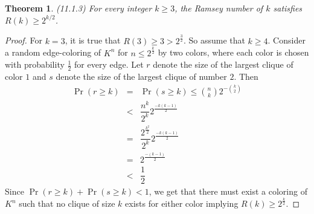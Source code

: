 \documentclass[12pt]{article}
\newtheorem{theorem}{Theorem}
\begin{document}
\begin{theorem} (11.1.3) For every integer $k \geq 3$, the Ramsey
  number of $k$ satisfies $R(k) \geq 2^{k/2}$.
\end{theorem}
\begin{proof} For $k = 3$, it is true that
  $R(3) \geq 3 > 2^\frac{3}{2}$. So assume that $k \geq 4$. Consider a
  random edge-coloring of $K^{n}$ for $n \leq 2^{\frac{k}{2}}$ by two
  colors, where each color is chosen with probability $\frac{1}{2}$
  for every edge. Let $r$ denote the size of the largest clique of
  color $1$ and $s$ denote the size of the largest clique of number
  $2$. Then
  \[
    \begin{array}{rcl} \Pr(r \geq k) & = & \Pr(s \geq k) \leq {n
                                           \choose k} 2^{-{k \choose 2}}\\
                                     & < & \dfrac{n^k}{2^k}
                                           2^{\frac{-k(k-1)}{2}}\\
                                     & = &
                                           \dfrac{2^{\frac{k^2}{2}}}{2^k}
                                           2^{\frac{-k(k-1)}{2}}\\
                                     & = & 2^{\frac{-(k-1)}{2}}\\
                                     & < & \dfrac{1}{2}
    \end{array}
  \]
  Since $\Pr(r \geq k) + \Pr(s \geq k) < 1$, we get that there must
  exist a coloring of $K^{n}$ such that no clique of size $k$ exists
  for either color implying $R(k) \geq 2^{\frac{k}{2}}$.
\end{proof}
\end{document}
